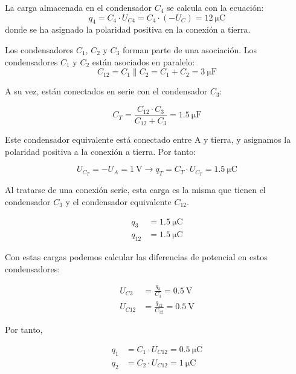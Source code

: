 La carga almacenada en el condensador $C_4$ se calcula con la ecuación:
\begin{equation*}
  q_4 = C_4 \cdot U_{C4} = C_4 \cdot (-U_C) = \qty{12}{\micro\coulomb}
\end{equation*}
donde se ha asignado la polaridad positiva en la conexión a tierra.

Los condensadores $C_1$, $C_2$ y $C_3$ forman parte de una asociación. Los condensadores $C_1$ y $C_2$ están asociados en paralelo:
\begin{equation*}
  C_{12} = C_1 \parallel C_2 = C_1 + C_2 = \qty{3}{\micro\farad}
\end{equation*}

A su vez, están conectados en serie con el condensador $C_3$:

\begin{equation*}
  C_T = \frac{C_{12} \cdot C_3}{C_{12} + C_3} = \qty{1.5}{\micro\farad}
\end{equation*}

Este condensador equivalente está conectado entre A y tierra, y asignamos la polaridad positiva a la conexión a tierra. Por tanto:

\begin{equation*}
  U_{C_T} = -U_A = \qty{1}{\volt} \rightarrow q_T = C_T \cdot U_{C_T} = \qty{1.5}{\micro\coulomb}
\end{equation*}

Al tratarse de una conexión serie, esta carga es la misma que tienen el condensador $C_3$ y el condensador equivalente $C_{12}$.

\begin{align*}
  q_3 &=  \qty{1.5}{\micro\coulomb}\\
  q_{12} &=  \qty{1.5}{\micro\coulomb}
\end{align*}

Con estas cargas podemos calcular las diferencias de potencial en estos condensadores:

\begin{align*}
  U_{C3} &=  \frac{q_3}{C_3} = \qty{0.5}{\volt}\\
  U_{C12} &=  \frac{q_{12}}{C_{12}} = \qty{0.5}{\volt}
\end{align*}

Por tanto,

\begin{align*}
  q_1 &= C_1 \cdot U_{C12} = \qty{0.5}{\micro\coulomb}\\
  q_2 &= C_2 \cdot U_{C12} = \qty{1}{\micro\coulomb}
\end{align*}

